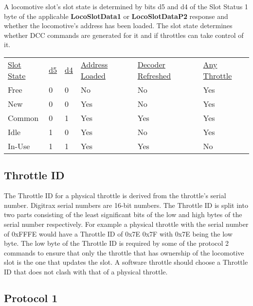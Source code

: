 A locomotive slot's \gls{slot state} is determined by bits d5 and d4 of the \gls{Slot Status 1} byte of the applicable \textbf{LocoSlotData1} or \textbf{LocoSlotDataP2} response and whether the locomotive's address has been loaded. The slot state determines whether DCC commands are generated for it and if throttles can take control of it.

\begin{tabular}{l l l l l l}
\underline{Slot State} & \underline{d5} & \underline{d4} & \underline{Address Loaded} & \underline{Decoder Refreshed} & \underline{Any Throttle}\\
Free & 0 & 0 & No & No & Yes\\
New & 0 & 0 & Yes & No & Yes\\
Common & 0 & 1 & Yes & Yes & Yes\\
Idle & 1 & 0 & Yes & No & Yes\\
In-Use & 1 & 1 & Yes & Yes & No\\
\end{tabular}

\subsection{Throttle ID}

The \gls{Throttle ID} for a \gls{physical throttle} is derived from the throttle's serial number. Digitrax serial numbers are 16-bit numbers. The Throttle ID is split into two parts consisting of the least significant bits of the low and high bytes of the serial number respectively. For example a physical throttle with the serial number of 0xFFFE would have a Throttle ID of 0x7E 0x7F with 0x7E being the low byte. The low byte of the Throttle ID is required by some of the protocol 2 commands to ensure that only the throttle that has ownership of the locomotive slot is the one that updates the slot. A \gls{software throttle} should choose a Throttle ID that does not clash with that of a physical throttle.

\subsection{Protocol 1}

